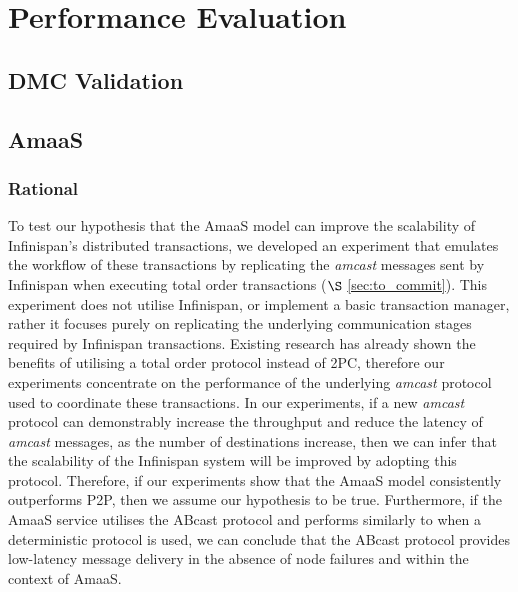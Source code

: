 \chapter{Performance Evaluation}

    \graphicspath{{Chapter6-PerformanceEvaluation/Figs/Vector/}{Chapter6-PerformanceEvaluation/Figs/}}
    

\section{DMC Validation}

\section{AmaaS}
    \subsection{Rational}
	To test our hypothesis that the \textsf{AmaaS} model can improve the scalability of Infinispan's distributed transactions, we developed an experiment that emulates the workflow of these transactions by replicating the \emph{amcast} messages sent by Infinispan when executing total order transactions ($\S$ \ref{sec:to_commit}).  This experiment does not utilise Infinispan, or implement a basic transaction manager, rather it focuses purely on replicating the underlying communication stages required by Infinispan transactions.  Existing research \citep{Ruivo:2011:ETO:2120967.2121604} has already shown the benefits of utilising a total order protocol instead of 2PC, therefore our experiments concentrate on the performance of the underlying \emph{amcast} protocol used to coordinate these transactions.  In our experiments, if a new \emph{amcast} protocol can demonstrably increase the throughput and reduce the latency of \emph{amcast} messages, as the number of destinations increase,  then we can infer that the scalability of the Infinispan system will be improved by adopting this protocol.  Therefore, if our experiments show that the \textsf{AmaaS} model consistently outperforms P2P, then we assume our hypothesis to be true. Furthermore, if the \textsf{AmaaS} service utilises the \textsf{ABcast} protocol and performs similarly to when a deterministic protocol is used, we can conclude that the \textsf{ABcast} protocol provides low-latency message delivery in the absence of node failures and within the context of \textsf{AmaaS}.  
	
